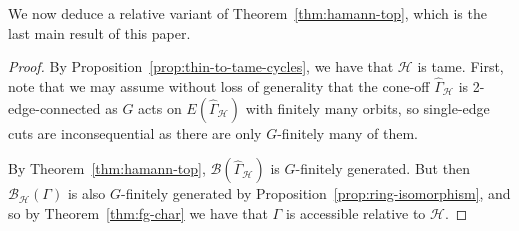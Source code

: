 \documentclass[11pt,a4paper]{amsart}
\newtheorem{theorem}{Theorem}[section]%
\theoremstyle{definition}
\newcommand{\per}{\mathcal{H}}
\newcommand{\br}{{\mathscr{B}}}
\newcommand{\cyc}{\mathscr{C}}
\begin{document}
We now deduce a relative variant of Theorem~\ref{thm:hamann-top}, which is the last main result of this paper. 

\relcycs*

\begin{proof}
    By Proposition~\ref{prop:thin-to-tame-cycles}, we have that $\per$ is tame. 
    First, note that we may assume without loss of generality that the cone-off $\widehat \Gamma_\per$ is 2-edge-connected as $G$ acts on $E(\widehat \Gamma_\per)$ with finitely many orbits, so single-edge cuts are inconsequential as there are only $G$-finitely many of them.
    
    By Theorem~\ref{thm:hamann-top}, $\br(\widehat \Gamma_\per)$ is $G$-finitely generated. But then $\br_\per(\Gamma)$ is also $G$-finitely generated by Proposition~\ref{prop:ring-isomorphism}, and so by Theorem~\ref{thm:fg-char} we have that $\Gamma$ is accessible relative to $\per$. 
\end{proof}















\end{document}
